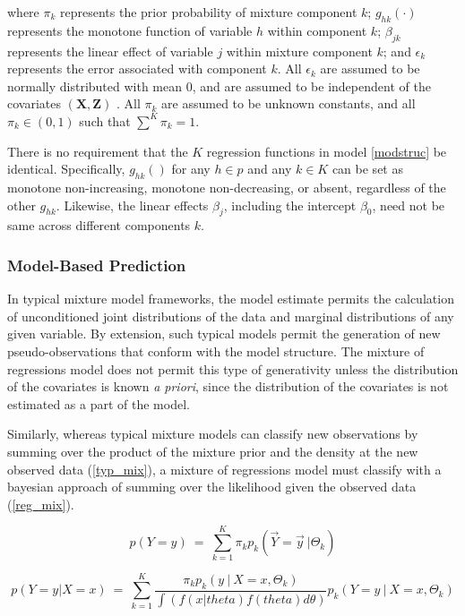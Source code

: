 \documentclass[fleqn,10pt]{olplainarticle}\usepackage[]{graphicx}\usepackage[]{color}
\begin{document}
where $\pi_k$ represents the prior probability of mixture component $k$; $g_{hk}(\cdot)$ represents the monotone function of variable $h$ within component $k$; $\beta_{jk}$ represents the linear effect of variable $j$ within mixture component $k$; and $\epsilon_k$ represents the error associated with component $k$. All $\epsilon_k$ are assumed to be normally distributed with mean $0$, and are assumed to be independent of the covariates $(\boldsymbol{X}, \boldsymbol{Z})$ . All $\pi_k$ are assumed to be unknown constants, and all $\pi_k \in (0,1)$ such that $\sum^{K} \pi_k = 1$.

There is no requirement that the $K$ regression functions in model \ref{modstruc} be identical. Specifically, $g_{hk}()$ for any $h \in p$ and any $k \in K$ can be set as monotone non-increasing, monotone non-decreasing, or absent, regardless of the other $g_{hk}$. Likewise, the linear effects $\beta_{j}$, including the intercept $\beta_0$, need not be same across different components $k$.


\subsubsection{Model-Based Prediction}

In typical mixture model frameworks, the model estimate permits the calculation of unconditioned joint distributions of the data and marginal distributions of any given variable. By extension, such typical models permit the generation of new pseudo-observations that conform with the model structure. The mixture of regressions model does not permit this type of generativity unless the distribution of the covariates is known \emph{a priori}, since the distribution of the covariates is not estimated as a part of the model. 

Similarly, whereas typical mixture models can classify new observations by summing over the product of the mixture prior and the density at the new observed data (\ref{typ_mix}), a mixture of regressions model must classify with a bayesian approach of summing over the likelihood given the observed data (\ref{reg_mix}).

\begin{equation} \label{typ_mix}
  p(Y = y) \ =\ \sum_{k=1}^{K}\pi_k p_k(\vec{Y} = \vec{y}\ | \Theta_k)
\end{equation}

\begin{equation} \label{reg_mix}
  p(Y = y | X = x) \ =\ \sum_{k=1}^{K}\frac{\pi_k p_k(y \ | \ X = x, \Theta_k)}{\int(f(x|theta)f(theta)d\theta)}p_k(Y = y\ |\ X = x, \Theta_k)
\end{equation}
\end{document}
